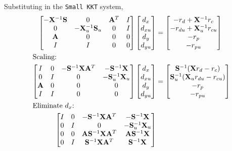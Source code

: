 \documentclass[10pt,a4paper]{article}
\begin{document}
Substituting in the \texttt{Small KKT} system,
\begin{align*}
\begin{bmatrix}
-\mathbf{X}^{-1}\mathbf{S} & 0 & \mathbf{A}^T & I\\
0 & -\mathbf{X}_u^{-1}\mathbf{S}_u & 0 & I\\
\mathbf{A} & 0 & 0 & 0 \\
I & I & 0 & 0
\end{bmatrix}
\begin{bmatrix}d_x \\ d_{xu} \\ d_y \\ d_{yu}\end{bmatrix} &= 
\begin{bmatrix}
-r_d + \mathbf{X}^{-1}r_c \\
-r_{du} + \mathbf{X}_u^{-1}r_{cu} \\
-r_p \\
-r_{pu}
\end{bmatrix} \\
\intertext{Scaling:}
\begin{bmatrix}
I & 0 & -\mathbf{S}^{-1}\mathbf{X}\mathbf{A}^T & -\mathbf{S}^{-1}\mathbf{X} \\
0 & I & 0 & -\mathbf{S}_u^{-1}\mathbf{X}_u \\
\mathbf{A} & 0 & 0 & 0 \\
I & I & 0 & 0
\end{bmatrix}
\begin{bmatrix}d_x \\ d_{xu} \\ d_y \\ d_{yu}\end{bmatrix} &= 
\begin{bmatrix}
\mathbf{S}^{-1}(\mathbf{X}r_d - r_c) \\
\mathbf{S}_u^{-1}(\mathbf{X}_ur_{du} - r_{cu}) \\
-r_p \\
-r_{pu}
\end{bmatrix} \\
\intertext{Eliminate $d_x$:}
\begin{bmatrix}
I & 0 & -\mathbf{S}^{-1}\mathbf{X}\mathbf{A}^T & -\mathbf{S}^{-1}\mathbf{X} \\
0 & I & 0 & -\mathbf{S}_u^{-1}\mathbf{X}_u \\
0 & 0 & \mathbf{A}\mathbf{S}^{-1}\mathbf{X}\mathbf{A}^T & \mathbf{A}\mathbf{S}^{-1}\mathbf{X} \\
0 & I & \mathbf{S}^{-1}\mathbf{X}\mathbf{A}^T & \mathbf{S}^{-1}\mathbf{X}

\end{bmatrix}
\end{align*}
\end{document}
